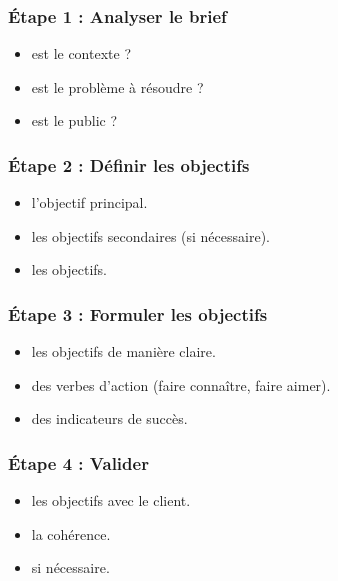 \subsubsection{Étape 1 : Analyser le brief}

\begin{itemize}
    \item {} est le contexte ?
    \item {} est le problème à résoudre ?
    \item {} est le public ?
\end{itemize}

\subsubsection{Étape 2 : Définir les objectifs}

\begin{itemize}
    \item {} l'objectif principal.
    \item {} les objectifs secondaires (si nécessaire).
    \item {} les objectifs.
\end{itemize}

\subsubsection{Étape 3 : Formuler les objectifs}

\begin{itemize}
    \item {} les objectifs de manière claire.
    \item {} des verbes d'action (faire connaître, faire aimer).
    \item {} des indicateurs de succès.
\end{itemize}

\subsubsection{Étape 4 : Valider}

\begin{itemize}
    \item {} les objectifs avec le client.
    \item {} la cohérence.
    \item {} si nécessaire.
\end{itemize}

